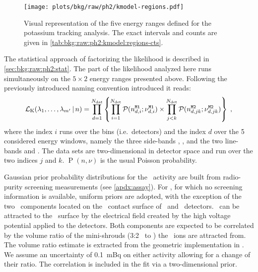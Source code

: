 \begin{figure}
  \centering
  \texttt{[image: plots/bkg/raw/ph2/kmodel-regions.pdf]}
  \caption{%
    Visual representation of the five energy ranges defined for the potassium tracking
    analysis. The exact intervals and counts are given in
    \cref{tab:bkg:raw:ph2:kmodel:regions-cts}.
  }\label{fig:bkg:raw:ph2:kmodel:regions}
\end{figure}

The statistical approach of factorizing the likelihood is described in
\cref{sec:bkg:raw:ph2:stat}. The part of the likelihood analyzed here runs simultaneously
on the $5 \times 2$ energy ranges presented above. Following the previously introduced
naming convention introduced it reads:
\begin{equation}\label{eq:bkg:raw:ph2:kmodel:likelihood}
  \mathcal{L}_\text{K}(\lambda_1,\ldots,\lambda_{m'}\,|\,n) =
  \prod_{d=1}^{N_\text{dat}}
  \left\{
    \prod_{i=1}^{N_\text{det}}
    \mathcal{P}(n_{d,i}^\text{\texttt{M1}};\nu_{d,i}^\text{\texttt{M1}})
    \times
    \prod_{j<k}^{N_\text{det}}
    \mathcal{P}(n_{d,jk}^\text{\texttt{M2}};\nu_{d,jk}^\text{\texttt{M2}})
  \right\}\;,
\end{equation}
where the index $i$ runs over the bins (i.e.~detectors) and the index $d$ over the 5
considered energy windows, namely the three side-bands , ,  and the
two line-bands  and .  The  data sets are two-dimensional in detector
space and run over the two indices $j$ and $k$. $\operatorname{P}(n,\nu)$ is the usual
Poisson probability.

Gaussian prior probability distributions for the \kvn\ activity are built from
radio-purity screening measurements (see \cref{apdx:assay}). For \kvz, for which no
screening information is available, uniform priors are adopted, with the exception of the
two \kvz\ components located on the \nplus\ contact surface of \bege\ and \scoax\
detectors. \kvz\ can be attracted to the \nplus\ surface by the electrical field created
by the high voltage potential applied to the detectors. Both components are expected to be
correlated by the volume ratio of the mini-shrouds (3:2 \bege\ to \scoax) the \kvz\ ions
are attracted from. The volume ratio estimate is extracted from the geometric
implementation in \mage.  We assume an uncertainty of 0.1~mBq on either activity allowing
for a change of their ratio. The correlation is included in the fit via a two-dimensional
prior.

